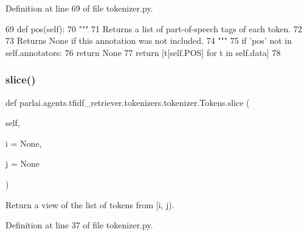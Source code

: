 Definition at line 69 of file tokenizer.\+py.


\begin{DoxyCode}
69     \textcolor{keyword}{def }pos(self):
70         \textcolor{stringliteral}{"""}
71 \textcolor{stringliteral}{        Returns a list of part-of-speech tags of each token.}
72 \textcolor{stringliteral}{}
73 \textcolor{stringliteral}{        Returns None if this annotation was not included.}
74 \textcolor{stringliteral}{        """}
75         \textcolor{keywordflow}{if} \textcolor{stringliteral}{'pos'} \textcolor{keywordflow}{not} \textcolor{keywordflow}{in} self.annotators:
76             \textcolor{keywordflow}{return} \textcolor{keywordtype}{None}
77         \textcolor{keywordflow}{return} [t[self.POS] \textcolor{keywordflow}{for} t \textcolor{keywordflow}{in} self.data]
78 
\end{DoxyCode}
\mbox{\label{classparlai_1_1agents_1_1tfidf__retriever_1_1tokenizers_1_1tokenizer_1_1Tokens_a8e68a443796116164126c7216f5963d3}} 
\subsubsection{\texorpdfstring{slice()}{slice()}}
{\footnotesize\ttfamily def parlai.\+agents.\+tfidf\+\_\+retriever.\+tokenizers.\+tokenizer.\+Tokens.\+slice (\begin{DoxyParamCaption}\item[{}]{self,  }\item[{}]{i = {\ttfamily None},  }\item[{}]{j = {\ttfamily None} }\end{DoxyParamCaption})}

\begin{DoxyVerb}Return a view of the list of tokens from [i, j).
\end{DoxyVerb}
 

Definition at line 37 of file tokenizer.\+py.


